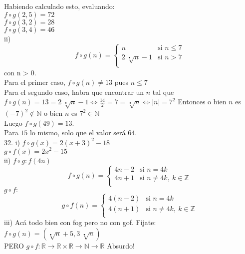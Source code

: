 \documentclass[a4paper,11pt]{article}
\begin{document}
Habiendo calculado esto, evaluando:\\
\(f \circ g (2,5) = 72\)\\
\(f \circ g (3,2) = 28\)\\
\(f \circ g (3,4) = 46\)\\
ii) \[
  f\circ g(n) =
  \begin{cases}
                                   n & \text{si $n \leq 7$} \\
                                   2\:\sqrt[•]{n} - 1 & \text{si $n > 7$} \\
  \end{cases}
%
\]
con n > 0.\\
Para el primer caso, $f\circ g(n) \neq 13$ pues $n\leq 7$\\
Para el segundo caso, habra que encontrar un $n$ tal que $f\circ g(n) = 13 = 2\:\sqrt[•]{n} - 1 \Leftrightarrow \frac{14}{2} = 7 = \sqrt[•]{n} \Leftrightarrow |n| = 7^2$
Entonces o bien $n$ es $(-7)^2\notin \mathbb{N}$ o bien $n$ es $7^2 \in \mathbb{N}$\\
Luego $f\circ g (49) = 13$. \\
Para $15$ lo mismo, solo que el valor será $64$.\\
32. i) $f \circ g (x) = 2(x+3)^2 - 18$\\
$g \circ f (x) = 2x^2 - 15$\\
ii) $f \circ g : f(4n)$
\[
  f\circ g(n) =
  \begin{cases}
                                   4n - 2 & \text{si $n = 4k$} \\
                                   4n + 1 & \text{si $n \neq 4k,$}\: k \in \mathbb{Z} \\
  \end{cases}
%
\]
$g \circ f:$ \\
\[
  g\circ f(n) =
  \begin{cases}
                                   4(n-2) & \text{si $n = 4k$} \\
                                   4(n+1) & \text{si $n \neq 4k,$}\: k \in \mathbb{Z}\\
                                   
  \end{cases}
%
\]
iii) Acá todo bien con fog pero no con gof. Fijate: \\
$f\circ g (n) = (\sqrt[•]{n} + 5, 3\:\sqrt[•]{n})$\\
PERO $g \circ f: \mathbb{R} \rightarrow \mathbb{R}\times\mathbb{R} \rightarrow \mathbb{N} \rightarrow \mathbb{R}$ Absurdo! \\
\end{document}
